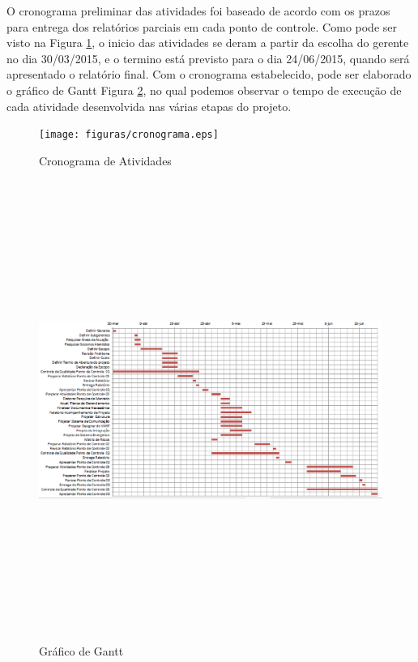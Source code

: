 O cronograma preliminar das atividades foi baseado de acordo com os prazos para entrega dos relatórios parciais em cada ponto de controle. Como pode ser visto na Figura \ref{fig:cronograma}, o inicio das atividades se deram a partir da escolha do gerente no dia 30/03/2015, e o termino está previsto para o dia 24/06/2015, quando será apresentado o relatório final.
Com o cronograma estabelecido, pode ser elaborado o gráfico de Gantt Figura \ref{fig:gantt}, no qual podemos observar o tempo de execução de cada atividade desenvolvida nas várias etapas do projeto. 

\vfill
 \begin{figure}[H]
	\centering
		\texttt{[image: figuras/cronograma.eps]}
	\caption{Cronograma de Atividades}
	\label{fig:cronograma}
\end{figure}


 \begin{figure}[H]
	\centering
		\includegraphics[height=15cm,width=18cm]{figuras/gantt.eps}
	\caption{Gráfico de Gantt}
	\label{fig:gantt}
\end{figure}
